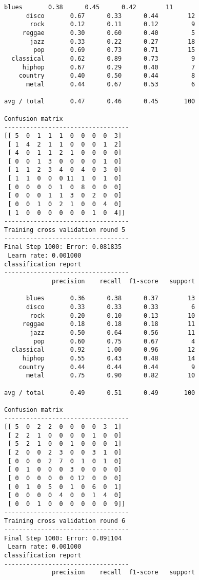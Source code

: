 \documentclass{article}
\begin{document}
\begin{Verbatim}[commandchars=\\\{\}]
      blues       0.38      0.45      0.42        11
      disco       0.67      0.33      0.44        12
       rock       0.12      0.11      0.12         9
     reggae       0.30      0.60      0.40         5
       jazz       0.33      0.22      0.27        18
        pop       0.69      0.73      0.71        15
  classical       0.62      0.89      0.73         9
     hiphop       0.67      0.29      0.40         7
    country       0.40      0.50      0.44         8
      metal       0.44      0.67      0.53         6

avg / total       0.47      0.46      0.45       100

Confusion matrix
----------------------------------
[[ 5  0  1  1  1  0  0  0  0  3]
 [ 1  4  2  1  1  0  0  0  1  2]
 [ 4  0  1  1  2  1  0  0  0  0]
 [ 0  0  1  3  0  0  0  0  1  0]
 [ 1  1  2  3  4  0  4  0  3  0]
 [ 1  1  0  0  0 11  1  0  1  0]
 [ 0  0  0  0  1  0  8  0  0  0]
 [ 0  0  0  1  1  3  0  2  0  0]
 [ 0  0  1  0  2  1  0  0  4  0]
 [ 1  0  0  0  0  0  0  1  0  4]]
----------------------------------
Training cross validation round 5
----------------------------------
Final Step 1000: Error: 0.081835 
 Learn rate: 0.001000
classification report 
----------------------------------
             precision    recall  f1-score   support

      blues       0.36      0.38      0.37        13
      disco       0.33      0.33      0.33         6
       rock       0.20      0.10      0.13        10
     reggae       0.18      0.18      0.18        11
       jazz       0.50      0.64      0.56        11
        pop       0.60      0.75      0.67         4
  classical       0.92      1.00      0.96        12
     hiphop       0.55      0.43      0.48        14
    country       0.44      0.44      0.44         9
      metal       0.75      0.90      0.82        10

avg / total       0.49      0.51      0.49       100

Confusion matrix
----------------------------------
[[ 5  0  2  2  0  0  0  0  3  1]
 [ 2  2  1  0  0  0  0  1  0  0]
 [ 5  2  1  0  0  1  0  0  0  1]
 [ 2  0  0  2  3  0  0  3  1  0]
 [ 0  0  0  2  7  0  1  0  1  0]
 [ 0  1  0  0  0  3  0  0  0  0]
 [ 0  0  0  0  0  0 12  0  0  0]
 [ 0  1  0  5  0  1  0  6  0  1]
 [ 0  0  0  0  4  0  0  1  4  0]
 [ 0  0  1  0  0  0  0  0  0  9]]
----------------------------------
Training cross validation round 6
----------------------------------
Final Step 1000: Error: 0.091104 
 Learn rate: 0.001000
classification report 
----------------------------------
             precision    recall  f1-score   support


\end{Verbatim}
\end{document}
